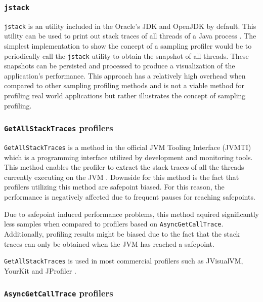 \documentclass[..thesis.tex]{subfiles}
\begin{document}
\subsubsection{\texttt{jstack}}
\texttt{jstack} is an utility included in the Oracle's JDK and OpenJDK by default. This utility can be used to print out stack traces of all threads of a Java process \cite{jstack}. The simplest implementation to show the concept of a sampling profiler would be to periodically call the \texttt{jstack} utility to obtain the snapshot of all threads. These snapshots can be persisted and processed to produce a visualization of the application's performance. This approach has a relatively high overhead when compared to other sampling profiling methods and is not a viable method for profiling real world applications but rather illustrates the concept of sampling profiling.

\subsubsection{\texttt{GetAllStackTraces} profilers}
\texttt{GetAllStackTraces} is a method in the official JVM Tooling Interface (JVMTI) which is a programming interface utilized by development and monitoring tools. This method enables the profiler to extract the stack traces of all the threads currently executing on the JVM \cite{jvmtm}. Downside for this method is the fact that profilers utilizing this method are safepoint biased. For this reason, the performance is negatively affected due to frequent pauses for reaching safepoints.

Due to safepoint induced performance problems, this method aquired significantly less samples when compared to profilers based on \texttt{Async\-Get\-Call\-Trace}. Additionally, profiling results might be biased due to the fact that the stack traces can only be obtained when the JVM has reached a safepoint.

\texttt{GetAllStackTraces} is used in most commercial profilers such as JVisualVM, YourKit and JProfiler \cite{wakart_psychosomatic_2016, visualvm}.  


\subsubsection{\texttt{AsyncGetCallTrace} profilers}
\end{document}
